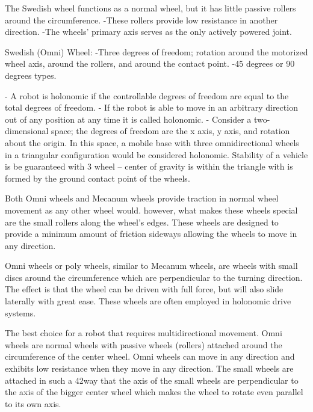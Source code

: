 The Swedish wheel functions as a normal wheel,
but it has little passive rollers around the
circumference.
-These rollers provide low resistance in another
direction.
-The wheels’ primary axis serves as the only actively
powered joint.

Swedish (Omni) Wheel:
-Three degrees of freedom;
rotation around the motorized
wheel axis, around the rollers,
and around the contact point.
-45 degrees or 90 degrees types.


- A robot is holonomic if the controllable degrees of
freedom are equal to the total degrees of freedom.
- If the robot is able to move in an arbitrary direction out of any
position at any time it is called holonomic.
- Consider a two-dimensional space; the degrees of freedom
are the x axis, y axis, and rotation about the origin. In this
space, a mobile base with three omnidirectional wheels in a
triangular configuration would be considered holonomic.
Stability of a vehicle is be guaranteed with 3 wheel
– center of gravity is within the triangle with is formed by
the ground contact point of the wheels.

Both Omni wheels and Mecanum wheels provide traction in normal wheel movement as any other wheel would. however, what makes these wheels special are the small rollers along the wheel's edges. These wheels are designed to provide a minimum amount of friction sideways allowing the wheels to move in any direction.

Omni wheels or poly wheels, similar to Mecanum wheels, are wheels with small discs around the circumference which are perpendicular to the turning direction. The effect is that the wheel can be driven with full force, but will also slide laterally with great ease. These wheels are often employed in holonomic drive systems.

The best choice for a robot that requires multidirectional movement. Omni wheels are normal wheels with passive wheels (rollers) attached
around the circumference of the center wheel.
Omni wheels can move in any direction and exhibits low resistance when they move in any direction. The small wheels are attached in such a
42way that the axis of the small wheels are perpendicular to the axis of the
bigger center wheel which makes the wheel to rotate even parallel to its own
axis.
\fi

